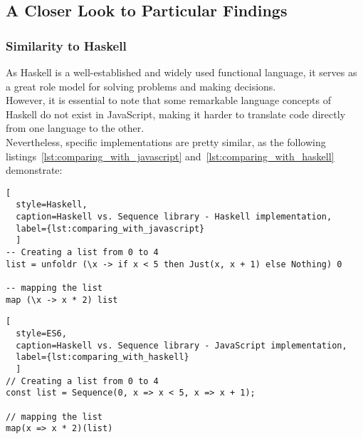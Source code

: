 \subsection{A Closer Look to Particular Findings}
\label{sub:A Closer Look to Particular Findings}

\subsubsection{Similarity to Haskell}
\label{subsub:Similarity to Haskell}
As Haskell is a well-established and widely used functional language, it serves
as a great role model for solving problems and making decisions. \\
However, it is essential to note that some remarkable language concepts of
Haskell do not exist in JavaScript, making it harder to translate code directly
from one language to the other.\\
Nevertheless, specific implementations are
pretty similar, as the following listings~\ref{lst:comparing_with_javascript}
and~\ref{lst:comparing_with_haskell} demonstrate:

\begin{lstlisting}[
  style=Haskell, 
  caption=Haskell vs. Sequence library - Haskell implementation, 
  label={lst:comparing_with_javascript}
  ]
-- Creating a list from 0 to 4
list = unfoldr (\x -> if x < 5 then Just(x, x + 1) else Nothing) 0

-- mapping the list
map (\x -> x * 2) list 
\end{lstlisting}

\begin{lstlisting}[
  style=ES6, 
  caption=Haskell vs. Sequence library - JavaScript implementation,
  label={lst:comparing_with_haskell}
  ]
// Creating a list from 0 to 4
const list = Sequence(0, x => x < 5, x => x + 1);

// mapping the list
map(x => x * 2)(list)
\end{lstlisting}
